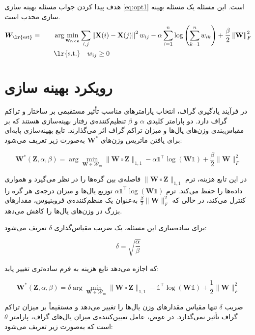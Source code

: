\documentclass[10pt,twocolumn,a4paper]{article}
\begin{document}
	هدف پیدا کردن جواب مسئله بهینه سازی
\ref{eq:opt1}
است. این مسئله یک مسئله بهینه سازی محدب است. 
\begin{equation}\label{eq:opt1}
	\begin{aligned}
		& \bm{W}_{\text{\lr{est}}} = &\quad &\arg \min_{\mathbf{w_{n \times n}}}\sum_{i,j} \left\| \mathbf{X}(i) - \mathbf{X}(j) \right\|^2 w_{ij} - \alpha \sum_{i=1}^{n} \log \left( \sum_{k=1}^{n} w_{ik} \right) + \frac{\beta}{2} \left\| \mathbf{W} \right\|_F^2 \\
		& &\quad & \text{\lr{s.t.}} \quad w_{ij} \geq 0
	\end{aligned}
\end{equation}

	\section{رویکرد بهینه سازی}
	در فرآیند یادگیری گراف، انتخاب پارامترهای مناسب تأثیر مستقیمی بر ساختار و تراکم گراف دارد. دو پارامتر کلیدی \( \alpha \) و \( \beta \) تنظیم‌کننده‌ی رفتار بهینه‌سازی هستند که بر مقیاس‌بندی وزن‌های یال‌ها و میزان تراکم گراف اثر می‌گذارند. تابع بهینه‌سازی پایه‌ای برای یافتن ماتریس وزن‌های \( \bm{W}^* \) به‌صورت زیر تعریف می‌شود:

	\[
		\bm{W}^*(\bm{Z}, \alpha, \beta) = \arg \min_{\bm{W} \in \mathcal{W}_m} \|\bm{W} \circ \bm{Z}\|_{1,1} - \alpha \mathds{1}^\top \log(\bm{W} \mathds{1}) + \frac{\beta}{2} \|\bm{W}\|_F^2
	\]

	در این تابع هزینه، ترم \( \|\bm{W} \circ \bm{Z}\|_{1,1} \) فاصله‌ی بین گره‌ها را در نظر می‌گیرد و همواری داده‌ها را حفظ می‌کند. ترم \( \alpha \mathds{1}^\top \log(\bm{W} \mathds{1}) \) توزیع یال‌ها و میزان درجه‌ی هر گره را کنترل می‌کند، در حالی که \( \frac{\beta}{2} \|\bm{W}\|_F^2 \) به‌عنوان یک منظم‌کننده‌ی فروبنیوس، مقدارهای بزرگ در وزن‌های یال‌ها را کاهش می‌دهد.

	برای ساده‌سازی این مسئله، یک ضریب مقیاس‌گذاری \( \delta \) تعریف می‌شود:

	\[
		\delta = \sqrt{\frac{\alpha}{\beta}}
	\]

	که اجازه می‌دهد تابع هزینه به فرم ساده‌تری تغییر یابد:

	\[
		\bm{W}^*(\bm{Z}, \alpha, \beta) = \delta \arg \min_{\bm{W} \in \mathcal{W}_m} \|\bm{W} \circ \bm{Z}\|_{1,1} - \mathds{1}^\top \log(\bm{W} \mathds{1}) + \frac{1}{2} \|\bm{W}\|_F^2
	\]

	ضریب \( \delta \) تنها مقیاس مقدارهای وزن یال‌ها را تغییر می‌دهد و مستقیماً بر میزان تراکم گراف تأثیر نمی‌گذارد. در عوض، عامل تعیین‌کننده‌ی میزان یال‌های گراف، پارامتر \( \theta \) است که به‌صورت زیر تعریف می‌شود:
\end{document}
